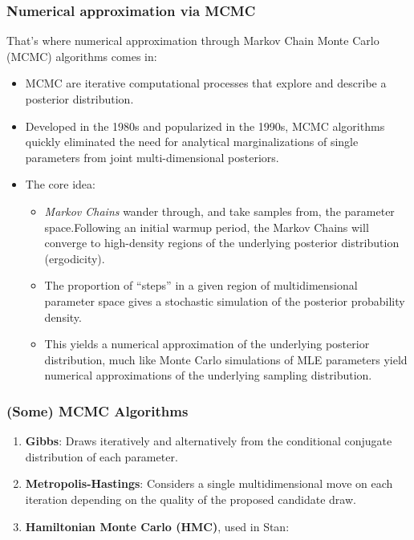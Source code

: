 \documentclass[
  11pt,
]{article}
\providecommand{\tightlist}{%
  \setlength{\itemsep}{0pt}\setlength{\parskip}{0pt}}
\begin{document}
\hypertarget{numerical-approximation-via-mcmc}{%
\subsubsection{Numerical approximation via MCMC}\label{numerical-approximation-via-mcmc}}

That's where numerical approximation through Markov Chain Monte Carlo (MCMC) algorithms comes in:

\begin{itemize}
\tightlist
\item
  MCMC are iterative computational processes that explore and describe a posterior distribution.
\item
  Developed in the 1980s and popularized in the 1990s, MCMC algorithms quickly eliminated the need for analytical marginalizations of single parameters from joint multi-dimensional posteriors.
\item
  The core idea:

  \begin{itemize}
  \tightlist
  \item
    \emph{Markov Chains} wander through, and take samples from, the parameter space.Following an initial warmup period, the Markov Chains will converge to high-density regions of the underlying posterior distribution (ergodicity).
  \item
    The proportion of ``steps'' in a given region of multidimensional parameter space gives a stochastic simulation of the posterior probability density.
  \item
    This yields a numerical approximation of the underlying posterior distribution, much like Monte Carlo simulations of MLE parameters yield numerical approximations of the underlying sampling distribution.
  \end{itemize}
\end{itemize}

\hypertarget{some-mcmc-algorithms}{%
\subsubsection{(Some) MCMC Algorithms}\label{some-mcmc-algorithms}}

\begin{enumerate}
\def\labelenumi{\arabic{enumi}.}
\tightlist
\item
  \textbf{Gibbs}: Draws iteratively and alternatively from the conditional conjugate distribution of each parameter.
\item
  \textbf{Metropolis-Hastings}: Considers a single multidimensional move on each iteration depending on the quality of the proposed candidate draw.
\item
  \textbf{Hamiltonian Monte Carlo (HMC)}, used in Stan:
\end{enumerate}
\end{document}
